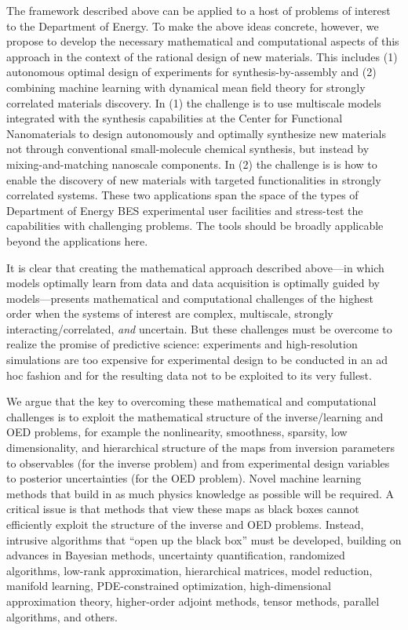 \documentclass[11pt]{article}
\begin{document}
  The framework described above can be applied to a host of problems
  of interest to the Department of Energy.  To make the above ideas
  concrete, however, we propose to develop the necessary mathematical
  and computational aspects of this approach in the context of the
  rational design of new materials. This includes (1) autonomous
  optimal design of experiments for synthesis-by-assembly and (2)
  combining machine learning with dynamical mean field theory for
  strongly correlated materials discovery.  In (1) the challenge is to
  use multiscale models integrated with the synthesis capabilities at
  the Center for Functional Nanomaterials to design autonomously and
  optimally synthesize new materials not through conventional
  small-molecule chemical synthesis, but instead by
  mixing-and-matching nanoscale components.  In (2) the challenge is
  is how to enable the discovery of new materials with targeted
  functionalities in strongly correlated systems.  These two
  applications span the space of the types of Department of Energy BES
  experimental user facilities and stress-test the capabilities with
  challenging problems.  The tools should be broadly applicable beyond
  the applications here.

It is clear that creating the mathematical approach described
above---in which models optimally learn from data and data acquisition
is optimally guided by models---presents mathematical and
computational challenges of the highest order when the systems of
interest are complex, multiscale, strongly interacting/correlated, {\em and}
uncertain. But these challenges must be overcome to realize the
promise of predictive science: experiments and high-resolution
simulations are too expensive for experimental design to be conducted
in an ad hoc fashion and for the resulting data not to be exploited to
its very fullest.

We argue that the key to overcoming these mathematical and
computational challenges is to exploit the mathematical structure of
the inverse/learning and OED problems, for example the nonlinearity,
smoothness, sparsity, low dimensionality, and hierarchical structure
of the maps from inversion parameters to observables (for the inverse
problem) and from experimental design variables to posterior
uncertainties (for the OED problem).  Novel machine learning methods
that build in as much physics knowledge as possible will be required.
A critical issue is that methods that view these maps as black boxes
cannot efficiently exploit the structure of the inverse and OED
problems. Instead, intrusive algorithms that ``open up the black box''
must be developed, building on advances in Bayesian methods,
uncertainty quantification, randomized algorithms, low-rank
approximation, hierarchical matrices, model reduction, manifold
learning, PDE-constrained optimization, high-dimensional approximation
theory, higher-order adjoint methods, tensor methods, parallel
algorithms, and others.
\end{document}
